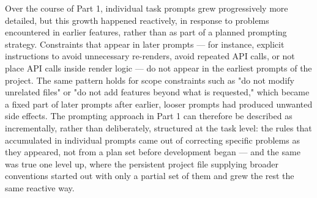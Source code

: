 Over the course of Part 1, individual task prompts grew progressively more detailed, but this growth happened reactively, in response to problems encountered in earlier features, rather than as part of a planned prompting strategy. Constraints that appear in later prompts --- for instance, explicit instructions to avoid unnecessary re-renders, avoid repeated API calls, or not place API calls inside render logic --- do not appear in the earliest prompts of the project. The same pattern holds for scope constraints such as "do not modify unrelated files" or "do not add features beyond what is requested," which became a fixed part of later prompts after earlier, looser prompts had produced unwanted side effects. The prompting approach in Part 1 can therefore be described as incrementally, rather than deliberately, structured at the task level: the rules that accumulated in individual prompts came out of correcting specific problems as they appeared, not from a plan set before development began --- and the same was true one level up, where the persistent project file supplying broader conventions started out with only a partial set of them and grew the rest the same reactive way.

